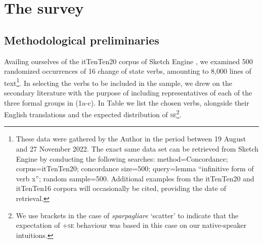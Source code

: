 \documentclass[output=paper,colorlinks,citecolor=brown
]{langscibook}
\begin{document}
\section{The survey}
\label{bentley_section_3}
\subsection{Methodological preliminaries}
\label{bentley_section_3.1}
Availing ourselves of the itTenTen20 corpus of Sketch Engine \citep{jakubicek2013tenten}, we examined 500 randomized occurrences of 16 change of state verbs, amounting to 8,000 lines of text\footnote{These data were gathered by the Author in the period between 19 August and 27 November 2022. The exact same data set can be retrieved from Sketch Engine by conducting the following searches: method=Concordance; corpus=itTenTen20; concordance size=500; query=lemma “infinitive form of verb x”; random sample=500. Additional examples from the itTenTen20 and itTenTen16 corpora \citep{jakubicek2013tenten} will occasionally be cited, providing the date of retrieval.}.  In selecting the verbs to be included in the sample, we drew on the secondary literature \citep{folli2005consuming,cennamo2012aspectual,cennamo2021anticausatives,cennamo2011anticausative,alexiadou2015external,bentley2023internally} with the purpose of including representatives of each of the three formal groups in (1a-c). In Table  we list the chosen verbs, alongside their English translations and the expected distribution of \textsc{se}\footnote{We use brackets in the case of \textit{sparpagliare} ‘scatter’ to indicate that the expectation of +\textsc{se} behaviour was based in this case on our native-speaker intuitions.}. 
\end{document}

